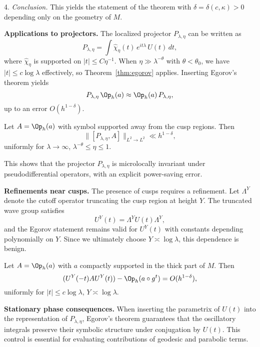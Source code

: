 4. \emph{Conclusion.} This yields the statement of the theorem with $\delta = \delta(c, \kappa) > 0$ depending only on the geometry of $M$.

\medskip

\textbf{Applications to projectors.} The localized projector $P_{\lambda,\eta}$ can be written as
\[
P_{\lambda,\eta} = \int \widehat{\chi}_\eta(t)\, e^{it\lambda}\, U(t)\, dt,
\]
where $\widehat{\chi}_\eta$ is supported on $|t| \leq C \eta^{-1}$. When $\eta \gg \lambda^{-\theta}$ with $\theta < \theta_0$, we have $|t| \leq c \log \lambda$ effectively, so Theorem~\ref{thm:egorov} applies. Inserting Egorov’s theorem yields
\[
P_{\lambda,\eta}\, \Op_h(a) \approx \Op_h(a)\, P_{\lambda,\eta},
\]
up to an error $O(h^{1-\delta})$.

\begin{corollary}\label{cor:microlocal}
Let $A = \Op_h(a)$ with symbol supported away from the cusp regions. Then
\[
\| [P_{\lambda,\eta}, A] \|_{L^2 \to L^2} \ll h^{1-\delta},
\]
uniformly for $\lambda \to \infty$, $\lambda^{-\theta} \leq \eta \leq 1$.
\end{corollary}

This shows that the projector $P_{\lambda,\eta}$ is microlocally invariant under pseudodifferential operators, with an explicit power-saving error.

\medskip

\textbf{Refinements near cusps.} The presence of cusps requires a refinement. Let $\Lambda^Y$ denote the cutoff operator truncating the cusp region at height $Y$. The truncated wave group satisfies
\[
U^Y(t) = \Lambda^Y U(t) \Lambda^Y,
\]
and the Egorov statement remains valid for $U^Y(t)$ with constants depending polynomially on $Y$. Since we ultimately choose $Y \asymp \log \lambda$, this dependence is benign.

\begin{lemma}\label{lem:egorov-trunc}
Let $A = \Op_h(a)$ with $a$ compactly supported in the thick part of $M$. Then
\[
(U^Y(-t) A U^Y(t)) - \Op_h(a \circ g^t) = O(h^{1-\delta}),
\]
uniformly for $|t| \leq c \log \lambda$, $Y \asymp \log \lambda$.
\end{lemma}

\medskip

\textbf{Stationary phase consequences.} When inserting the parametrix of $U(t)$ into the representation of $P_{\lambda,\eta}$, Egorov’s theorem guarantees that the oscillatory integrals preserve their symbolic structure under conjugation by $U(t)$. This control is essential for evaluating contributions of geodesic and parabolic terms.

